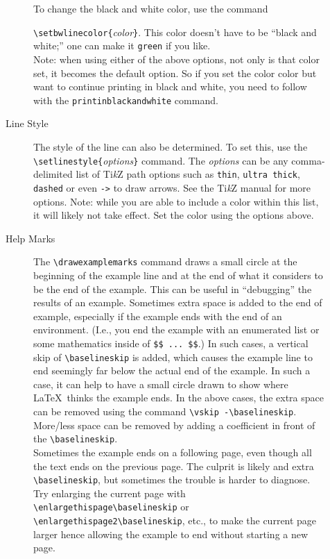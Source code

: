 \documentclass[10pt]{article}
\begin{document}
\begin{description}
\begin{description}
		To change the black and white color, use the command 
		
		\verb|\setbwlinecolor{|{\it color}\verb|}|. This color doesn't have to be ``black and white;'' one can make it \verb|green| if you like. \\
		
		Note: when using either of the above options, not only is that color set, it becomes the default option. So if you set the color color but want to continue printing in black and white, you need to follow with the \verb|printinblackandwhite| command.
		
		\item [Line Style] The style of the line can also be determined. To set this, use the \verb|\setlinestyle{|{\it options}\verb|}| command. The {\it options} can be any comma-delimited list of Ti{\it k}Z path options such as \verb|thin|, \verb|ultra thick|, \verb|dashed| or even \verb|->| to draw arrows. See the Ti{\it k}Z manual for more options. Note: while you are able to include a color within this list, it will likely not take effect. Set the color using the options above. 
		
		\item [Help Marks] The \verb|\drawexamplemarks| command draws a small circle at the beginning of the example line and at the end of what it considers to be the end of the example. This can be useful in ``debugging'' the results of an example. Sometimes extra space is added to the end of example, especially if the example ends with the end of an environment. (I.e., you end the example with an enumerated list or some mathematics inside of \verb|$$ ... $$|.) In such cases, a vertical skip of \verb|\baselineskip| is added, which causes the example line to end seemingly far below the actual end of the example. In such a case, it can help to have a small circle drawn to show where \LaTeX\ thinks the example ends. In the above cases, the extra space can be removed using the command \verb|\vskip -\baselineskip|. More/less space can be removed by adding a coefficient in front of the \verb|\baselineskip|. \\
		
		Sometimes the example ends on a following page, even though all the text ends on the previous page. The culprit is likely and extra \verb|\baselineskip|, but sometimes the trouble is harder to diagnose. Try enlarging the current page with \verb|\enlargethispage\baselineskip| or \verb|\enlargethispage2\baselineskip|, etc., to make the current page larger hence allowing the example to end without starting a new page.
		\end{description}
\end{description}
\end{document}
